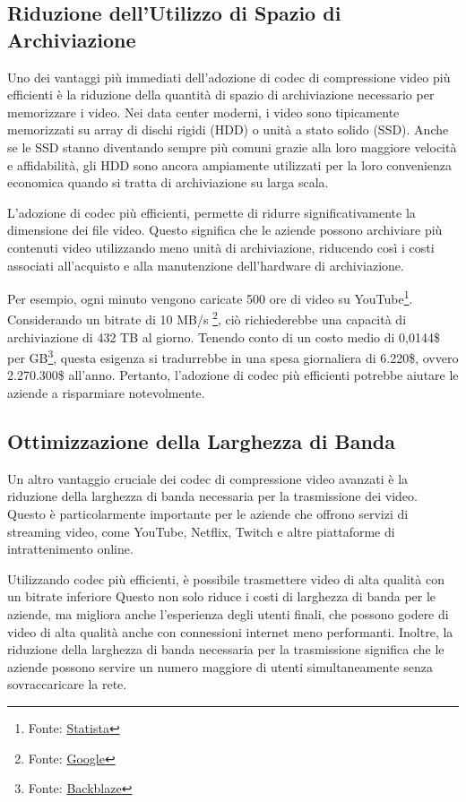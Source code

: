 \documentclass[a4paper,12pt, oneside]{article}
\begin{document}
\subsection{Riduzione dell'Utilizzo di Spazio di Archiviazione}
Uno dei vantaggi più immediati dell'adozione di codec di compressione video più efficienti è la riduzione
della quantità di spazio di archiviazione necessario per memorizzare i video. Nei data center moderni, i
video sono tipicamente memorizzati su array di dischi rigidi (HDD) o unità a stato solido (SSD). Anche se
le SSD stanno diventando sempre più comuni grazie alla loro maggiore velocità e affidabilità, gli HDD
sono ancora ampiamente utilizzati per la loro convenienza economica quando si tratta di archiviazione
su larga scala.

L'adozione di codec più efficienti, permette di ridurre significativamente la dimensione dei file video.
Questo significa che le aziende possono archiviare più contenuti video utilizzando meno unità di archiviazione,
riducendo così i costi associati all'acquisto e alla manutenzione dell'hardware di archiviazione.

Per esempio, ogni minuto vengono caricate 500 ore di video su YouTube\footnote{Fonte: \href{https://www.statista.com/statistics/259477/hours-of-video-uploaded-to-youtube-every-minute/}{Statista}}.
Considerando un bitrate di 10 MB/s \footnote{Fonte: \href{https://support.google.com/youtube/answer/2853702?hl=it}{Google}},
ciò richiederebbe una capacità di archiviazione di 432 TB al giorno. Tenendo conto di un costo medio di
0,0144\$ per GB\footnote{Fonte: \href{https://www.backblaze.com/blog/hard-drive-cost-per-gigabyte/}{Backblaze}},
questa esigenza si tradurrebbe in una spesa giornaliera di 6.220\$, ovvero 2.270.300\$ all'anno. Pertanto,
l'adozione di codec più efficienti potrebbe aiutare le aziende a risparmiare notevolmente.

\subsection{Ottimizzazione della Larghezza di Banda}
Un altro vantaggio cruciale dei codec di compressione video avanzati è la riduzione della larghezza di
banda necessaria per la trasmissione dei video. Questo è particolarmente importante per le aziende che
offrono servizi di streaming video, come YouTube, Netflix, Twitch e altre piattaforme di intrattenimento online.

Utilizzando codec più efficienti, è possibile trasmettere video di alta qualità con un bitrate inferiore
Questo non solo riduce i costi di larghezza di banda per le aziende, ma migliora anche l'esperienza degli
utenti finali, che possono godere di video di alta qualità anche con connessioni internet meno performanti.
Inoltre, la riduzione della larghezza di banda necessaria per la trasmissione significa che le aziende possono
servire un numero maggiore di utenti simultaneamente senza sovraccaricare la rete.
\end{document}
